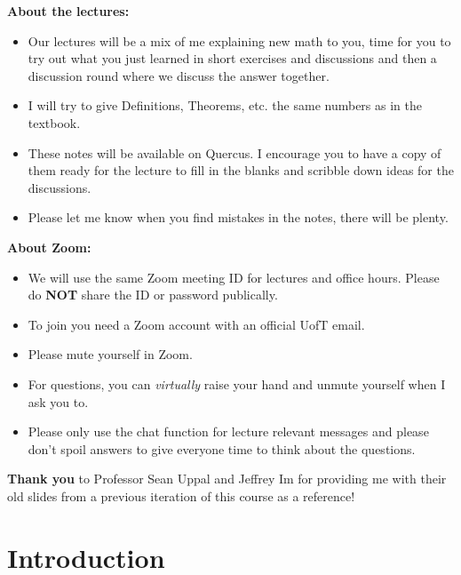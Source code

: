 \documentclass[letterpaper, 10pt]{article}
\begin{document}
\lb
\textbf{About the lectures:}
\begin{itemize}
    \item
        Our lectures will be a mix of me explaining new math to you, time for you to try out
        what you just learned in short exercises and discussions and then a discussion round
        where we discuss the answer together.
    \item
        I will try to give Definitions, Theorems, etc. the same numbers as in the textbook.
    \item
        These notes will be available on Quercus.
        I encourage you to have a copy of them ready for the lecture to fill in
        the blanks and scribble down ideas for the discussions.
    \item
        Please let me know when you find mistakes in the notes, there will be plenty.
\end{itemize}

\lb
\textbf{About Zoom:}
\begin{itemize}
    \item We will use the same Zoom meeting ID for lectures and office hours.
            Please do \textbf{NOT} share the ID or password publically.
    \item To join you need a Zoom account with an official UofT email.
    \item Please mute yourself in Zoom.
    \item For questions, you can \emph{virtually} raise your hand and unmute yourself when
        I ask you to.
    \item Please only use the chat function for lecture relevant messages and please don't spoil
        answers to give everyone time to think about the questions.
\end{itemize}
\lb
\textbf{Thank you } to Professor Sean Uppal and Jeffrey Im for providing me with their old slides from a previous iteration of this course as a reference!


\newpage
\section*{Introduction}%
\label{sec:introduction}
\end{document}
